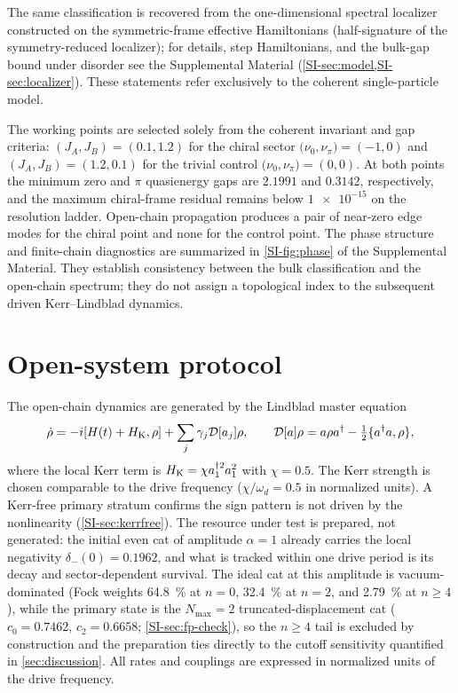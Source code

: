 \documentclass[aps,pra,preprint,superscriptaddress,amsmath,amssymb]{revtex4-2}
\begin{document}
The same classification is recovered from the one-dimensional spectral localizer constructed on the symmetric-frame effective Hamiltonians (half-signature of the symmetry-reduced localizer); for details, step Hamiltonians, and the bulk-gap bound under disorder see the Supplemental Material (\cref{SI-sec:model,SI-sec:localizer}). These statements refer exclusively to the coherent single-particle model.

The working points are selected solely from the coherent invariant and gap criteria: $(J_A,J_B)=(\num{0.1},\num{1.2})$ for the chiral sector $\bigl(\nu_0,\nu_\pi\bigr)=(-1,0)$ and $(J_A,J_B)=(\num{1.2},\num{0.1})$ for the trivial control $\bigl(\nu_0,\nu_\pi\bigr)=(0,0)$. At both points the minimum zero and $\pi$ quasienergy gaps are $\num{2.1991}$ and $\num{0.3142}$, respectively, and the maximum chiral-frame residual remains below $\num{1e-15}$ on the resolution ladder. Open-chain propagation produces a pair of near-zero edge modes for the chiral point and none for the control point. The phase structure and finite-chain diagnostics are summarized in \cref{SI-fig:phase} of the Supplemental Material. They establish consistency between the bulk classification and the open-chain spectrum; they do not assign a topological index to the subsequent driven Kerr--Lindblad dynamics.

\section{Open-system protocol}
\label{sec:protocol}

The open-chain dynamics are generated by the Lindblad master equation
\begin{equation}\label{eq:lindblad}
  \dot\rho=-i[H(t)+H_{\rm K},\rho] +\sum_j\gamma_j\mathcal{D}[a_j]\rho,
  \qquad
  \mathcal{D}[a]\rho=a\rho a^\dagger-\tfrac12\{a^\dagger a,\rho\},
\end{equation}
where the local Kerr term is $H_{\rm K}=\chi a_1^{\dagger2}a_1^2$ with $\chi=\num{0.5}$. The Kerr strength is chosen comparable to the drive frequency ($\chi/\omega_d=\num{0.5}$ in normalized units). A Kerr-free primary stratum confirms the sign pattern is not driven by the nonlinearity (\cref{SI-sec:kerrfree}). The resource under test is prepared, not generated: the initial even cat of amplitude $\alpha=\num{1}$ already carries the local negativity $\delta_-(\num{0})=\num{0.1962}$, and what is tracked within one drive period is its decay and sector-dependent survival. The ideal cat at this amplitude is vacuum-dominated (Fock weights \qty{64.8}{\percent} at $n=\num{0}$, \qty{32.4}{\percent} at $n=\num{2}$, and \qty{2.79}{\percent} at $n\ge\num{4}$), while the primary state is the $N_{\max}=\num{2}$ truncated-displacement cat ($c_0=\num{0.7462}$, $c_2=\num{0.6658}$; \cref{SI-sec:fp-check}), so the $n\ge\num{4}$ tail is excluded by construction and the preparation ties directly to the cutoff sensitivity quantified in \cref{sec:discussion}. All rates and couplings are expressed in normalized units of the drive frequency.
\end{document}
